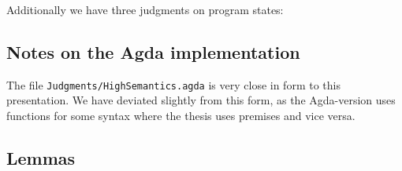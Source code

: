 
Additionally we have three judgments on program states:

\begin{mathpar}
\end{mathpar}

\begin{mathpar}
\end{mathpar}


\subsection{Notes on the Agda implementation}

The file \texttt{Judgments/HighSemantics.agda} is very close in form to this
presentation. We have deviated slightly from this form, as the Agda-version uses
functions for some syntax where the thesis uses premises and vice versa.

\subsection{Lemmas}

